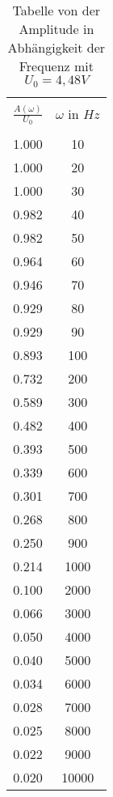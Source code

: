 \begin{table}[H]
  \centering
  \caption{Tabelle von der Amplitude in Abhängigkeit der Frequenz mit $U_0 = 4,48V$}
    \begin{tabular}{c c}
      \toprule \\
      $\frac{A(\omega)}{U_\text{0}}$ & $\omega \,\, \text{in} \,\, Hz$ \\
      \midrule \\
      1.000 & 10\\
      1.000 & 20\\
      1.000 & 30\\
      0.982 & 40\\
      0.982 & 50\\
      0.964 & 60\\
      0.946 & 70\\
      0.929 & 80\\
      0.929 & 90\\
      0.893 & 100\\
      0.732 & 200\\
      0.589 & 300\\
      0.482 & 400\\
      0.393 & 500\\
      0.339 & 600\\
      0.301 & 700\\
      0.268 & 800\\
      0.250 & 900\\
      0.214 & 1000\\
      0.100 & 2000\\
      0.066 & 3000\\
      0.050 & 4000\\
      0.040 & 5000\\
      0.034 & 6000\\
      0.028 & 7000\\
      0.025 & 8000\\
      0.022 & 9000\\
      0.020 & 10000\\
      \bottomrule
    \end{tabular}
    \label{tab:2}
  \end{table}
